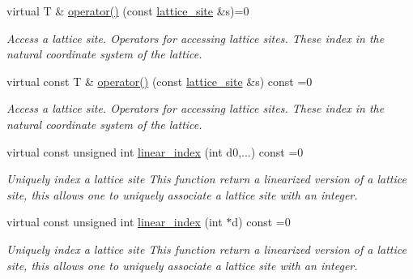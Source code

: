 \begin{DoxyCompactItemize}
\mbox{\label{classsisl_1_1base__lattice_a4b1b4b0ebdea39182f1962a020ce1dba}} 
virtual T \& \hyperlink{classsisl_1_1base__lattice_a4b1b4b0ebdea39182f1962a020ce1dba}{operator()} (const \hyperlink{namespacesisl_acd18feee4026583db6185df2b25434aa}{lattice\+\_\+site} \&s)=0
\begin{DoxyCompactList}\small\item\em Access a lattice site. Operators for accessing lattice sites. These index in the natural coordinate system of the lattice. \end{DoxyCompactList}\item 
\mbox{\label{classsisl_1_1base__lattice_ad522b89ea83ddd5fdead55d51a3e7432}} 
virtual const T \& \hyperlink{classsisl_1_1base__lattice_ad522b89ea83ddd5fdead55d51a3e7432}{operator()} (const \hyperlink{namespacesisl_acd18feee4026583db6185df2b25434aa}{lattice\+\_\+site} \&s) const =0
\begin{DoxyCompactList}\small\item\em Access a lattice site. Operators for accessing lattice sites. These index in the natural coordinate system of the lattice. \end{DoxyCompactList}\item 
\mbox{\label{classsisl_1_1base__lattice_a75869d632df9aba88b0a8ff289950d23}} 
virtual const unsigned int \hyperlink{classsisl_1_1base__lattice_a75869d632df9aba88b0a8ff289950d23}{linear\+\_\+index} (int d0,...) const =0
\begin{DoxyCompactList}\small\item\em Uniquely index a lattice site This function return a linearized version of a lattice site, this allows one to uniquely associate a lattice site with an integer. \end{DoxyCompactList}\item 
\mbox{\label{classsisl_1_1base__lattice_abacb50c47e6b1b790b9ae4130c219818}} 
virtual const unsigned int \hyperlink{classsisl_1_1base__lattice_abacb50c47e6b1b790b9ae4130c219818}{linear\+\_\+index} (int $\ast$d) const =0
\begin{DoxyCompactList}\small\item\em Uniquely index a lattice site This function return a linearized version of a lattice site, this allows one to uniquely associate a lattice site with an integer. \end{DoxyCompactList}\item 

\end{DoxyCompactItemize}
